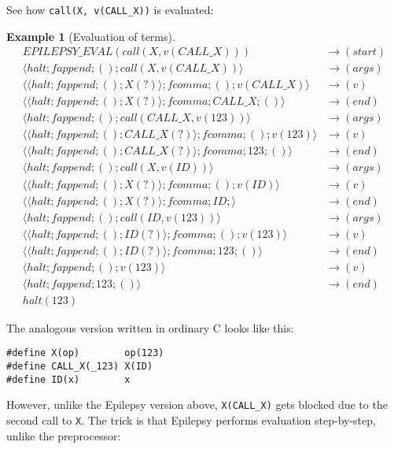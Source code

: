 \documentclass[12pt]{article}
\theoremstyle{break}
\newtheorem{example}{Example}
\begin{document}
See how \texttt{call(X, v(CALL\_X))} is evaluated:

\begin{example}[Evaluation of terms]
\small
\begin{align*}
    EPILEPSY\_EVAL(call(X, v(CALL\_X))) & \to (start) \\
    \langle halt; fappend; (); call(X, v(CALL\_X)) \rangle & \to (args) \\
    \langle \langle halt; fappend; (); X(?) \rangle; fcomma; (); v(CALL\_X) \rangle & \to (v) \\
    \langle \langle halt; fappend; (); X(?) \rangle; fcomma; CALL\_X; () \rangle & \to (end) \\
    \langle halt; fappend; (); call(CALL\_X, v(123)) \rangle & \to (args) \\
    \langle \langle halt; fappend; (); CALL\_X(?) \rangle; fcomma; (); v(123) \rangle & \to (v) \\
    \langle \langle halt; fappend; (); CALL\_X(?) \rangle; fcomma; 123; () \rangle & \to (end) \\
    \langle halt; fappend; (); call(X, v(ID)) \rangle & \to (args) \\
    \langle \langle halt; fappend; (); X(?) \rangle; fcomma; (); v(ID) \rangle & \to (v) \\
    \langle \langle halt; fappend; (); X(?) \rangle; fcomma; ID; \rangle & \to (end) \\
    \langle halt; fappend; (); call(ID, v(123)) \rangle & \to (args) \\
    \langle \langle halt; fappend; (); ID(?) \rangle; fcomma; (); v(123) \rangle & \to (v) \\
    \langle \langle halt; fappend; (); ID(?) \rangle; fcomma; 123; () \rangle & \to (end) \\
    \langle halt; fappend; (); v(123) \rangle & \to (v) \\
    \langle halt; fappend; 123; () \rangle & \to (end) \\
    halt(123) &
\end{align*}
\normalsize
\end{example}

The analogous version written in ordinary C looks like this:

\begin{verbatim}
#define X(op)        op(123)
#define CALL_X(_123) X(ID)
#define ID(x)        x
\end{verbatim}

However, unlike the Epilepsy version above, \texttt{X(CALL\_X)} gets blocked due to the
second call to \texttt{X}. The trick is that Epilepsy performs evaluation step-by-step,
unlike the preprocessor:
\end{document}
